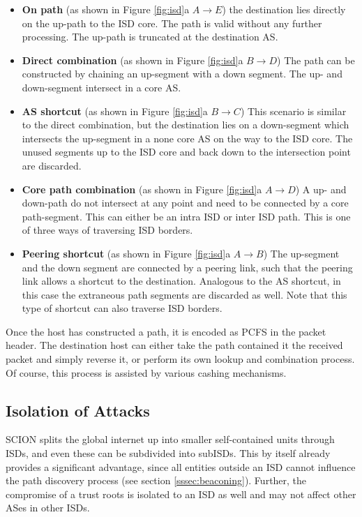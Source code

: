 \documentclass[../eva1_scion.tex]{subfiles}
\begin{document}
    \begin{itemize}
        \item \textbf{On path} (as shown in Figure \ref{fig:isd}a $A \rightarrow E$) the destination lies directly on the up-path to the ISD core. The path is valid without any further processing. The up-path is truncated at the destination AS.
        \item \textbf{Direct combination} (as shown in Figure \ref{fig:isd}a $B \rightarrow D$) The path can be constructed by chaining an up-segment with a down segment. The up- and down-segment intersect in a core AS.
        \item \textbf{AS shortcut} (as shown in Figure \ref{fig:isd}a $B \rightarrow C$) This scenario is similar to the direct combination, but the destination lies on a down-segment which intersects the up-segment in a none core AS on the way to the ISD core. The unused segments up to the ISD core and back down to the intersection point are discarded.
        \item \textbf{Core path combination} (as shown in Figure \ref{fig:isd}a $A \rightarrow D$) A up- and down-path do not intersect at any point and need to be connected by a core path-segment. This can either be an intra ISD or inter ISD path. This is one of three ways of traversing ISD borders.
        \item \textbf{Peering shortcut} (as shown in Figure \ref{fig:isd}a $A \rightarrow B$) The up-segment and the down segment are connected by a peering link, such that the peering link allows a shortcut to the destination. Analogous to the AS shortcut, in this case the extraneous path segments are discarded as well. Note that this type of shortcut can also traverse ISD borders.
    \end{itemize}

    Once the host has constructed a path, it is encoded as PCFS in the packet header. The destination host can either take the path contained it the received packet and simply reverse it, or perform its own lookup and combination process. Of course, this process is assisted by various cashing mechanisms.

    \subsection{Isolation of Attacks}
    SCION splits the global internet up into smaller self-contained units through ISDs, and even these can be subdivided  into  subISDs. This by itself already provides a significant advantage, since all entities outside an ISD cannot influence the path discovery process (see section \ref{sssec:beaconing}). Further, the compromise of a trust roots is isolated to an ISD as well and may not affect other ASes in other ISDs.
\end{document}

